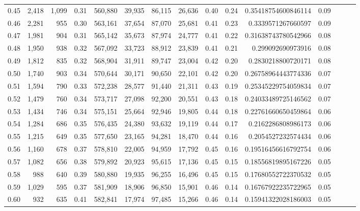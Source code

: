 \begin{tabular}{rrrrrrrrrrrrrrr}
0.45 &   2,418 &  1,099 &  0.31 &  560,880 &   39,935 &   86,115 &   26,636 &  0.40 &  0.24 &   0.35418754600846114 &      0.09 \\
0.46 &   2,281 &    955 &  0.30 &  563,161 &   37,654 &   87,070 &   25,681 &  0.41 &  0.23 &    0.3339571267660597 &      0.09 \\
0.47 &   1,981 &    904 &  0.31 &  565,142 &   35,673 &   87,974 &   24,777 &  0.41 &  0.22 &   0.31638743780542966 &      0.08 \\
0.48 &   1,950 &    938 &  0.32 &  567,092 &   33,723 &   88,912 &   23,839 &  0.41 &  0.21 &     0.299092690973916 &      0.08 \\
0.49 &   1,812 &    835 &  0.32 &  568,904 &   31,911 &   89,747 &   23,004 &  0.42 &  0.20 &    0.2830218800720171 &      0.08 \\
0.50 &   1,740 &    903 &  0.34 &  570,644 &   30,171 &   90,650 &   22,101 &  0.42 &  0.20 &   0.26758964443774336 &      0.07 \\
0.51 &   1,594 &    790 &  0.33 &  572,238 &   28,577 &   91,440 &   21,311 &  0.43 &  0.19 &   0.25345229754059834 &      0.07 \\
0.52 &   1,479 &    760 &  0.34 &  573,717 &   27,098 &   92,200 &   20,551 &  0.43 &  0.18 &   0.24033489725146562 &      0.07 \\
0.53 &   1,434 &    746 &  0.34 &  575,151 &   25,664 &   92,946 &   19,805 &  0.44 &  0.18 &   0.22761660650459864 &      0.06 \\
0.54 &   1,284 &    686 &  0.35 &  576,435 &   24,380 &   93,632 &   19,119 &  0.44 &  0.17 &    0.2162286808986173 &      0.06 \\
0.55 &   1,215 &    649 &  0.35 &  577,650 &   23,165 &   94,281 &   18,470 &  0.44 &  0.16 &    0.2054527232574434 &      0.06 \\
0.56 &   1,160 &    678 &  0.37 &  578,810 &   22,005 &   94,959 &   17,792 &  0.45 &  0.16 &   0.19516456616792754 &      0.06 \\
0.57 &   1,082 &    656 &  0.38 &  579,892 &   20,923 &   95,615 &   17,136 &  0.45 &  0.15 &   0.18556819895167226 &      0.05 \\
0.58 &     988 &    640 &  0.39 &  580,880 &   19,935 &   96,255 &   16,496 &  0.45 &  0.15 &   0.17680552722370532 &      0.05 \\
0.59 &   1,029 &    595 &  0.37 &  581,909 &   18,906 &   96,850 &   15,901 &  0.46 &  0.14 &   0.16767922235722965 &      0.05 \\
0.60 &     932 &    635 &  0.41 &  582,841 &   17,974 &   97,485 &   15,266 &  0.46 &  0.14 &   0.15941322028186003 &      0.05 \\

\end{tabular}

